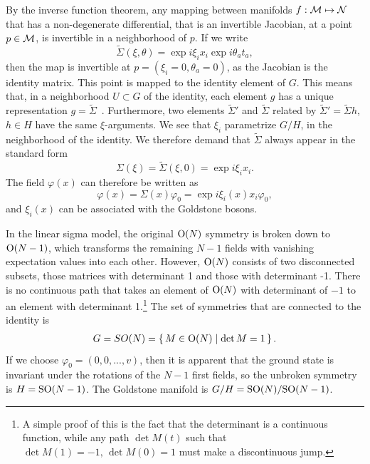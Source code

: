 By the inverse function theorem, any mapping between manifolds $f: \mathcal{M} \mapsto \mathcal{N}$ that has a non-degenerate differential, that is an invertible Jacobian, at a point $p \in \mathcal{M}$, is invertible in a neighborhood of $p$.
If we write
\begin{equation}
    \tilde \Sigma(\xi, \theta) = \exp{i \xi_i x_i} \exp{i \theta_a t_a},
\end{equation}
%
then the map is invertible at $p = (\xi_i = 0, \theta_a = 0)$, as the Jacobian is the identity matrix.
This point is mapped to the identity element of $G$.
This means that, in a neighborhood $U \subset G$ of the identity, each element $g$ has a unique representation $g = \tilde \Sigma$~\autocite{leeSmoothManifolds2012}.
Furthermore, two elements $\tilde \Sigma'$ and $\tilde \Sigma$ related by $\tilde \Sigma' = \tilde \Sigma h$, $h \in H$ have the same $\xi$-arguments.
We see that $\xi_i$ parametrize $G/H$, in the neighborhood of the identity.
We therefore demand that $\tilde \Sigma$ always appear in the standard form
\begin{equation}
    \Sigma(\xi) = \tilde \Sigma(\xi, 0) = \exp{i \xi_i x_i}.
\end{equation}
%
The field $\varphi(x)$ can therefore be written as
\begin{equation}
    \varphi(x) = \Sigma(x) \varphi_0 = \exp{i \xi_i(x) x_i} \varphi_0,
\end{equation}
%
and $\xi_i(x)$ can be associated with the Goldstone bosons.

In the linear sigma model, the original $\text O(N)$ symmetry is broken down to $\text O(N-1)$, which transforms the remaining $N-1$ fields with vanishing expectation values into each other.
However, $\text O(N)$ consists of two disconnected subsets, those matrices with determinant 1 and those with determinant -1.
There is no continuous path that takes an element of $\text O(N)$ with determinant of $-1$ to an element with determinant 1.\footnote{A simple proof of this is the fact that the determinant is a continuous function, while any path $\det M(t)$ such that $\det M(1) = -1,\, \det M(0) = 1$ must make a discontinuous jump.}
The set of symmetries that are connected to the identity is
\begin{eqnarray}
    G = SO(N) = \left\{\, M \in \text O(N) \mid  \det M = 1 \,\right\}.
\end{eqnarray}
If we choose $\varphi_0 = (0, 0, ..., v)$, then it is apparent that the ground state is invariant under the rotations of the $N-1$ first fields, so the unbroken symmetry is  $H = \text{SO}(N-1)$.
The Goldstone manifold is $G/H = \text{SO}(N) / \text{SO}(N-1)$.

